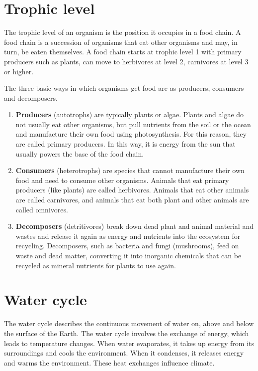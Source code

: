 \documentclass[]{book}
\providecommand{\tightlist}{%
  \setlength{\itemsep}{0pt}\setlength{\parskip}{0pt}}
\begin{document}
\hypertarget{trophic-level}{%
\section{Trophic level}\label{trophic-level}}

The trophic level of an organism is the position it occupies in a food chain. A food chain is a succession of organisms that eat other organisms and may, in turn, be eaten themselves. A food chain starts at trophic level 1 with primary producers such as plants, can move to herbivores at level 2, carnivores at level 3 or higher.

The three basic ways in which organisms get food are as producers, consumers and decomposers.

\begin{enumerate}
\def\labelenumi{\arabic{enumi}.}
\tightlist
\item
  \textbf{Producers} (autotrophs) are typically plants or algae. Plants and algae do not usually eat other organisms, but pull nutrients from the soil or the ocean and manufacture their own food using photosynthesis. For this reason, they are called primary producers. In this way, it is energy from the sun that usually powers the base of the food chain.
\item
  \textbf{Consumers} (heterotrophs) are species that cannot manufacture their own food and need to consume other organisms. Animals that eat primary producers (like plants) are called herbivores. Animals that eat other animals are called carnivores, and animals that eat both plant and other animals are called omnivores.
\item
  \textbf{Decomposers} (detritivores) break down dead plant and animal material and wastes and release it again as energy and nutrients into the ecosystem for recycling. Decomposers, such as bacteria and fungi (mushrooms), feed on waste and dead matter, converting it into inorganic chemicals that can be recycled as mineral nutrients for plants to use again.
\end{enumerate}

\hypertarget{water-cycle}{%
\section{Water cycle}\label{water-cycle}}

The water cycle describes the continuous movement of water on, above and below the surface of the Earth. The water cycle involves the exchange of energy, which leads to temperature changes. When water evaporates, it takes up energy from its surroundings and cools the environment. When it condenses, it releases energy and warms the environment. These heat exchanges influence climate.
\end{document}
